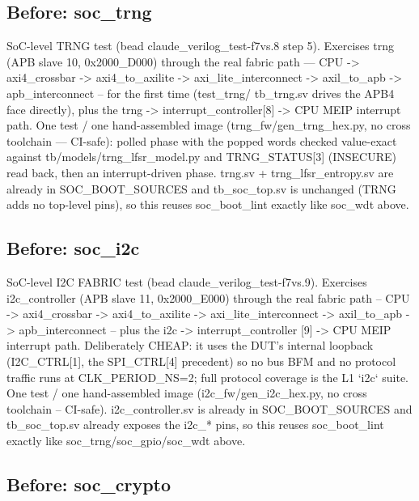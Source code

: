 \begin{record}
\subsection*{Before: soc\_trng}

\begin{textblock}
SoC-level TRNG test (bead claude_verilog_test-f7vs.8 step 5). Exercises trng (APB slave 10,
0x2000_D000) through the real fabric path — CPU -> axi4_crossbar -> axi4_to_axilite ->
axi_lite_interconnect -> axil_to_apb -> apb_interconnect -- for the first time (test_trng/
tb_trng.sv drives the APB4 face directly), plus the trng -> interrupt_controller[8] -> CPU MEIP
interrupt path. One test / one hand-assembled image (trng_fw/gen_trng_hex.py, no cross
toolchain — CI-safe): polled phase with the popped words checked value-exact against
tb/models/trng_lfsr_model.py and TRNG_STATUS[3] (INSECURE) read back, then an interrupt-driven
phase. trng.sv + trng_lfsr_entropy.sv are already in SOC_BOOT_SOURCES and tb_soc_top.sv is
unchanged (TRNG adds no top-level pins), so this reuses soc_boot_lint exactly like soc_wdt above.
\end{textblock}

\subsection*{Before: soc\_i2c}

\begin{textblock}
SoC-level I2C FABRIC test (bead claude_verilog_test-f7vs.9). Exercises i2c_controller (APB slave
11, 0x2000_E000) through the real fabric path -- CPU -> axi4_crossbar -> axi4_to_axilite ->
axi_lite_interconnect -> axil_to_apb -> apb_interconnect -- plus the i2c -> interrupt_controller
[9] -> CPU MEIP interrupt path. Deliberately CHEAP: it uses the DUT's internal loopback
(I2C_CTRL[1], the SPI_CTRL[4] precedent) so no bus BFM and no protocol traffic runs at
CLK_PERIOD_NS=2; full protocol coverage is the L1 `i2c` suite. One test / one hand-assembled
image (i2c_fw/gen_i2c_hex.py, no cross toolchain -- CI-safe). i2c_controller.sv is already in
SOC_BOOT_SOURCES and tb_soc_top.sv already exposes the i2c_* pins, so this reuses soc_boot_lint
exactly like soc_trng/soc_gpio/soc_wdt above.
\end{textblock}

\subsection*{Before: soc\_crypto}


\end{record}
